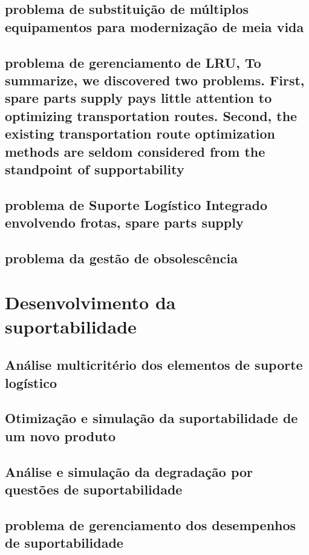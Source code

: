 \documentclass{amsart}
\begin{document}
\subsection{problema de substituição de múltiplos equipamentos para modernização de meia vida}

\subsection{problema de gerenciamento de LRU, To summarize, we discovered two problems. First, spare parts supply pays little attention to optimizing transportation routes. Second, the existing transportation route optimization methods are seldom considered from the standpoint of supportability}

\subsection{problema de Suporte Logístico Integrado envolvendo frotas, spare parts supply}

\subsection{problema da gestão de obsolescência}

\section{Desenvolvimento da suportabilidade}

\subsection{Análise multicritério dos elementos de suporte logístico}

\subsection{Otimização e simulação da suportabilidade de um novo produto}

\subsection{Análise e simulação da degradação por questões de suportabilidade}

\subsection{problema de gerenciamento dos desempenhos de suportabilidade}
\end{document}

